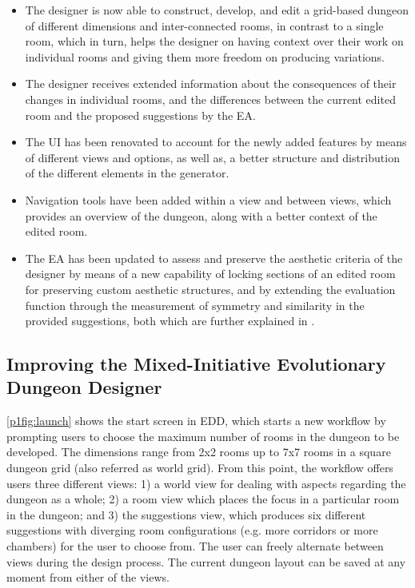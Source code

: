 \begin{itemize}
  \item The designer is now able to construct, develop, and edit a grid-based dungeon of different dimensions and inter-connected rooms, in contrast to a single room, which in turn, helps the designer on having context over their work on individual rooms and giving them more freedom on producing variations.
  \item The designer receives extended information about the consequences of their changes in individual rooms, and the differences between the current edited room and the proposed suggestions by the EA.
  \item The UI has been renovated to account for the newly added features by means of different views and options, as well as, a better structure and distribution of the different elements in the generator.
  \item Navigation tools have been added within a view and between views, which provides an overview of the dungeon, along with a better context of the edited room.
  \item The EA has been updated to assess and preserve the aesthetic criteria of the designer by means of a new capability of locking sections of an edited room for preserving custom aesthetic structures, and by extending the evaluation function through the measurement of symmetry and similarity in the provided suggestions, both which are further explained in .
\end{itemize}

\subsection{Improving the Mixed-Initiative Evolutionary Dungeon Designer} \label{p1approach}

\cref{p1fig:launch} shows the start screen in EDD, which starts a new workflow by prompting users to choose the maximum number of rooms in the dungeon to be developed. The dimensions range from 2x2 rooms up to 7x7 rooms in a square dungeon grid (also referred as world grid). From this point, the workflow offers users three different views: 1) a world view for dealing with aspects regarding the dungeon as a whole; 2) a room view which places the focus in a particular room in the dungeon; and 3) the suggestions view, which produces six different suggestions with diverging room configurations (e.g. more corridors or more chambers) for the user to choose from. The user can freely alternate between views during the design process. The current dungeon layout can be saved at any moment from either of the views.

